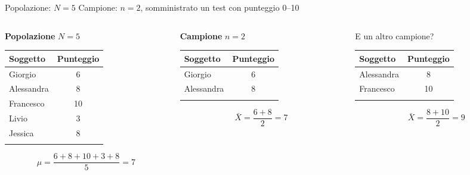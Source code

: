 \documentclass[
  ignorenonframetext,
  compress, aspectratio=149]{beamer}
\begin{document}
\begin{frame}{}
\label{section-10}
Popolazione: \(N = 5\) \newline Campione: \(n = 2\), somministrato un
test con punteggio 0--10

\vspace{2mm}

\begin{columns}[T]
\begin{column}{0.36\linewidth}
\centering

\textbf{Popolazione} \(N = 5\)

\small

\begin{longtable}[]{@{}lc@{}}
\toprule\noalign{}
Soggetto & Punteggio \\
\midrule\noalign{}
\endhead
Giorgio & 6 \\
Alessandra & 8 \\
Francesco & 10 \\
Livio & 3 \\
Jessica & 8 \\
\bottomrule\noalign{}
\end{longtable}

\[\mu = \dfrac{6 + 8 + 10 + 3 + 8}{5} = 7\]
\end{column}

\begin{column}{0.32\linewidth}
\centering

\textbf{Campione} \(n = 2\)

\small

\begin{longtable}[]{@{}lc@{}}
\toprule\noalign{}
Soggetto & Punteggio \\
\midrule\noalign{}
\endhead
Giorgio & 6 \\
Alessandra & 8 \\
\bottomrule\noalign{}
\end{longtable}

\[\bar{X} = \dfrac{6 + 8}{2} = 7\]
\end{column}

\begin{column}{0.32\linewidth}
\centering

E un altro campione?

\small

\begin{longtable}[]{@{}lc@{}}
\toprule\noalign{}
Soggetto & Punteggio \\
\midrule\noalign{}
\endhead
Alessandra & 8 \\
Francesco & 10 \\
\bottomrule\noalign{}
\end{longtable}

\[\bar{X} = \dfrac{8 + 10}{2} = 9\]
\end{column}
\end{columns}
\end{frame}
\end{document}
